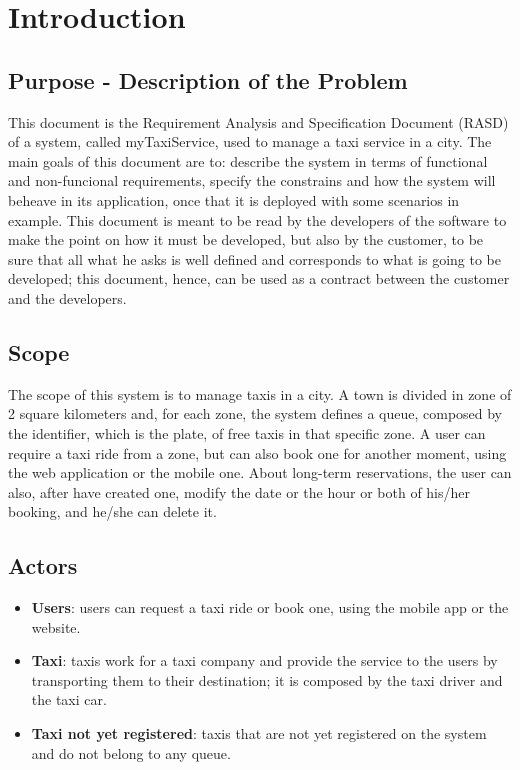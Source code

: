 \section{Introduction}
	\subsection{Purpose - Description of the Problem}
	This document is the Requirement Analysis and Specification Document (RASD) of a system, called myTaxiService, used to manage a taxi service in a city. The main goals of this document are to: describe the system in terms of functional and non-funcional requirements, specify the constrains and how the system will beheave in its application, once that it is deployed with some scenarios in example. This document is meant to be read by the developers of the software to make the point on how it must be developed, but also by the customer, to be sure that all what he asks is well defined and corresponds to what is going to be developed; this document, hence, can be used as a contract between the customer and the developers.
		
	\subsection{Scope}
	The scope of this system is to manage taxis in a city. A town is divided in zone of 2 square kilometers and, for each zone, the system defines a queue, composed by the identifier, which is the plate, of free taxis in that specific zone. A user can require a taxi ride from a zone, but can also book one for another moment, using the web application or the mobile one. About long-term reservations, the user can also, after have created one, modify the date or the hour or both of his/her booking, and he/she can delete it. 
	
	\subsection{Actors}
	\begin{itemize}
		\item \textbf{Users}: users can request a taxi ride or book one, using the mobile app or the website.
		\item \textbf{Taxi}: taxis work for a taxi company and provide the service to the users by transporting them to their destination; it is composed by the taxi driver and the taxi car.
		\item \textbf{Taxi not yet registered}: taxis that are not yet registered on the system and do not belong to any queue.
	\end{itemize}
	
